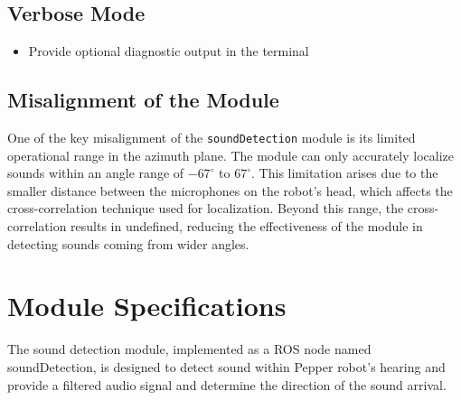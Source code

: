 \documentclass{CSSRforAfrica}
\begin{document}
\subsection*{Verbose Mode}
\begin{itemize}
	\item Provide optional diagnostic output in the terminal 
\end{itemize}

\subsection*{Misalignment of the Module}
One of the key misalignment of the \texttt{soundDetection} module is its limited operational range in the azimuth plane. The module can only accurately localize sounds within an angle range of \(-67^\circ\) to \(67^\circ\). This limitation arises due to the smaller distance between the microphones on the robot's head, which affects the cross-correlation technique used for localization. Beyond this range, the cross-correlation results in undefined, reducing the effectiveness of the module in detecting sounds coming from wider angles.

\newpage

\section{Module Specifications}
The sound detection module, implemented as a ROS node named soundDetection, is designed to detect sound within Pepper robot's hearing and provide a filtered audio signal and determine the direction of the sound arrival. 
\end{document}
